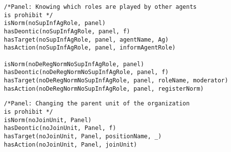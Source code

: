 \begin{verbatim}
/*Panel: Knowing which roles are played by other agents 
is prohibit */
isNorm(noSupInfAgRole, panel)
hasDeontic(noSupInfAgRole, panel, f)
hasTarget(noSupInfAgRole, panel, agentName, Ag)
hasAction(noSupInfAgRole, panel, informAgentRole)

isNorm(noDeRegNormNoSupInfAgRole, panel)
hasDeontic(noDeRegNormNoSupInfAgRole, panel, f)
hasTarget(noDeRegNormNoSupInfAgRole, panel, roleName, moderator)
hasAction(noDeRegNormNoSupInfAgRole, panel, registerNorm)
\end{verbatim}


\begin{verbatim}
/*Panel: Changing the parent unit of the organization 
is prohibit */
isNorm(noJoinUnit, Panel)
hasDeontic(noJoinUnit, Panel, f)
hasTarget(noJoinUnit, Panel, positionName, _)
hasAction(noJoinUnit, Panel, joinUnit)
\end{verbatim}


